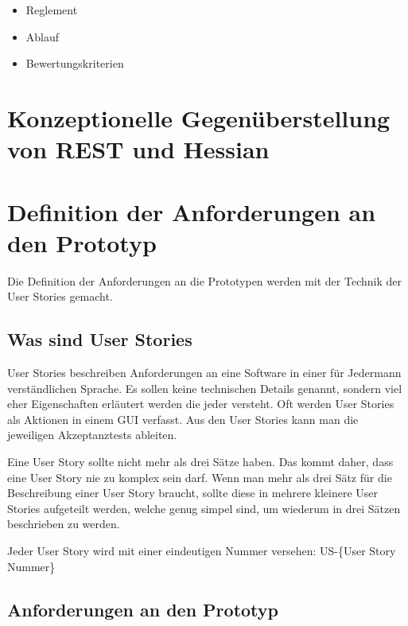 \documentclass[listof=totocnumbered, bibliography=totocnumbered]{scrreprt}
\begin{document}
  \begin{itemize}
      \item Reglement \cite{hsz_reglement}
      \item Ablauf \cite{hsz_ablauf}
      \item Bewertungskriterien \cite{hsz_bewertungskriterien}
  \end{itemize} 
  
  \newpage
  
  \section{Konzeptionelle Gegenüberstellung von REST und Hessian}
  
  
  \newpage
  
  \section{Definition der Anforderungen an den Prototyp}
  
  Die Definition der Anforderungen an die Prototypen werden mit der Technik der
  User Sto\-ries\cite{UserStories} gemacht.
  
  \subsection{Was sind User Stories}
  
  User Stories beschreiben Anforderungen an eine Software in einer für Jedermann
  verständlichen Sprache. Es sollen keine technischen Details genannt, sondern
  viel eher Eigenschaften erläutert werden die jeder versteht. Oft werden User
  Stories als Aktionen in einem \ac{GUI} verfasst. Aus den User Stories kann
  man die jeweiligen Akzeptanztests\cite{AcceptanceTests} ableiten.
  
  Eine User Story sollte nicht mehr als drei Sätze haben. Das kommt daher, dass
  eine User Story nie zu komplex sein darf. Wenn man mehr als drei Sätz für die
  Beschreibung einer User Story braucht, sollte diese in mehrere kleinere User
  Stories aufgeteilt werden, welche genug simpel sind, um wiederum in drei
  Sätzen beschrieben zu werden.
  
  Jeder User Story wird mit einer eindeutigen Nummer versehen: US-\{User Story
  Nummer\}
  
  \subsection{Anforderungen an den Prototyp}
  
\end{document}
